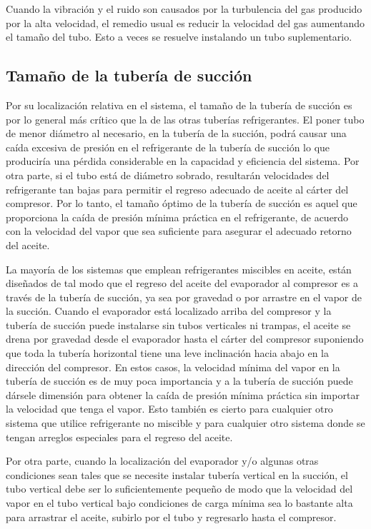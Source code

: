 	Cuando la vibración y el ruido son causados por la turbulencia del gas producido por la alta velocidad, el remedio usual es reducir la velocidad del gas aumentando el tamaño del tubo. Esto a veces se resuelve instalando un tubo suplementario.

	\subsection{Tamaño de la tubería de succión}

	Por su localización relativa en el sistema, el tamaño de la tubería de succión es por lo general más crítico que la de las otras tuberías refrigerantes. El poner tubo de menor diámetro al necesario, en la tubería de la succión, podrá causar una caída excesiva de presión en el refrigerante de la tubería de succión lo que produciría una pérdida considerable en la capacidad y eficiencia del sistema. Por otra parte, si el tubo está de diámetro sobrado, resultarán velocidades del refrigerante tan bajas para permitir el regreso adecuado de aceite al cárter del compresor. Por lo tanto, el tamaño óptimo de la tubería de succión es aquel que proporciona la caída de presión mínima práctica en el refrigerante, de acuerdo con la velocidad del vapor que sea suficiente para asegurar el adecuado retorno del aceite. 

	La mayoría de los sistemas que emplean refrigerantes miscibles en aceite, están diseñados de tal modo que el regreso del aceite del evaporador al compresor es a través de la tubería de succión, ya sea por gravedad o por arrastre en el vapor de la succión. Cuando el evaporador está localizado arriba del compresor y la tubería de succión puede instalarse sin tubos verticales ni trampas, el aceite se drena por gravedad desde el evaporador hasta el cárter del compresor suponiendo que toda la tubería horizontal tiene una leve inclinación hacia abajo en la dirección del compresor. En estos casos, la velocidad mínima del vapor en la tubería de succión es de muy poca importancia y a la tubería de succión puede dársele dimensión para obtener la caída de presión mínima práctica sin importar la velocidad que tenga el vapor. Esto también es cierto para cualquier otro sistema que utilice refrigerante no miscible y para cualquier otro sistema donde se tengan arreglos especiales para el regreso del aceite.

	Por otra parte, cuando la localización del evaporador y/o algunas otras condiciones sean tales que se necesite instalar tubería vertical en la succión, el tubo vertical debe ser lo suficientemente pequeño de modo que la velocidad del vapor en el tubo vertical bajo condiciones de carga mínima sea lo bastante alta para arrastrar el aceite, subirlo por el tubo y regresarlo hasta el compresor. 

